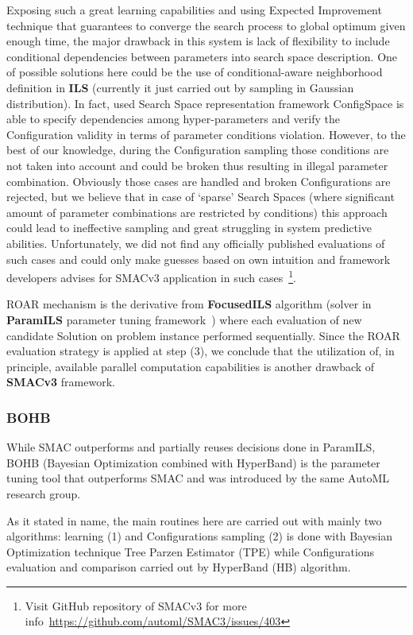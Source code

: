 Exposing such a great learning capabilities and using Expected Improvement technique that guarantees to converge the search process to global optimum given enough time, the major drawback in this system is lack of flexibility to include conditional dependencies between parameters into search space description. 
One of possible solutions here could be the use of conditional-aware neighborhood definition in \textbf{ILS} (currently it just carried out by sampling in Gaussian distribution). In fact, used Search Space representation framework ConfigSpace\cite{configspace} is able to specify dependencies among hyper-parameters and verify the Configuration validity in terms of parameter conditions violation. However, to the best of our knowledge, during the Configuration sampling those conditions are not taken into account and could be broken thus resulting in illegal parameter combination. Obviously those cases are handled and broken Configurations are rejected, but we believe that in case of `sparse' Search Spaces (where significant amount of parameter combinations are restricted by conditions) this approach could lead to ineffective sampling and great struggling in system predictive abilities. Unfortunately, we did not find any officially published evaluations of such cases and could only make guesses based on own intuition and framework developers advises for SMACv3 application in such cases~\footnote[1]{Visit GitHub repository of SMACv3 for more info~\url{https://github.com/automl/SMAC3/issues/403}}.

ROAR mechanism is the derivative from \textbf{FocusedILS} algorithm (solver in \textbf{ParamILS} parameter tuning framework~\cite{hutter2009paramils}) where each evaluation of new candidate Solution on problem instance performed sequentially. Since the ROAR evaluation strategy is applied at step (3), we conclude that the utilization of, in principle, available parallel computation capabilities is another drawback of \textbf{SMACv3} framework.


\subsubsection{BOHB~\cite{falkner2018bohb}}\label{bg: bohb}
While SMAC outperforms and partially reuses decisions done in ParamILS, BOHB (Bayesian Optimization combined with HyperBand) is the parameter tuning tool that outperforms SMAC and was introduced by the same AutoML research group.

As it stated in name, the main routines here are carried out with mainly two algorithms: learning (1) and Configurations sampling (2) is done with Bayesian Optimization technique Tree Parzen Estimator (TPE) while Configurations evaluation and comparison carried out by HyperBand (HB) algorithm.

